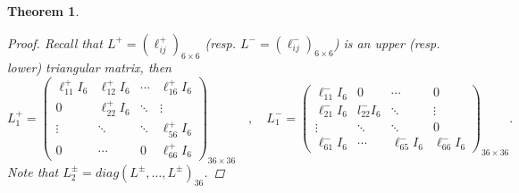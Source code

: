 \documentclass[10pt,a4paper]{amsart}
\newtheorem{theorem}{Theorem}
\numberwithin{equation}{section}
\begin{document}
\begin{theorem}
\begin{proof}
Recall that $L^{+}=(\ell^+_{ij})_{6\times 6}$ (resp. $L^{-}=(\ell^-_{ij})_{6\times 6}$) is an upper (resp. lower) triangular matrix, then
	 		$$
	 		L_1^{+}=\left(\begin{array}{cccc}
	 			\ell_{11}^{+} I_6 & \ell_{12}^{+} I_6 & \cdots & \ell_{16}^{+} I_6 \\
	 			0 & \ell_{22}^{+} I_6 & \ddots & \vdots \\
	 			\vdots & \ddots & \ddots & \ell_{56}^{+} I_6 \\
	 			0 & \cdots & 0 & \ell_{66}^{+} I_6
	 		\end{array}\right)_{36 \times 36} \quad, \quad L_1^{-}=\left(\begin{array}{cccc}
	 			\ell_{11}^{-} I_6 & 0 & \cdots & 0 \\
	 			\ell_{21}^{-} I_6 & l_{22}^{-} I_6 & \ddots & \vdots \\
	 			\vdots & \ddots & \ddots & 0 \\
	 			\ell_{61}^{-} I_6 & \cdots & \ell_{65}^{-} I_6 & \ell_{66}^{-} I_6
	 		\end{array}\right)_{36 \times 36}.
	 		$$
Note that $L_2^{\pm}=diag(L^{\pm}, \ldots, L^{\pm})_{36}$.

\end{proof}
\end{theorem}
\end{document}
